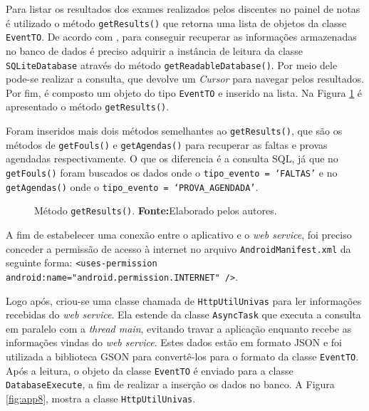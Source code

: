 	\par Para listar os resultados dos exames realizados pelos discentes no painel
de notas é utilizado o método \texttt{getResults()} que retorna uma lista de
objetos da classe \texttt{EventTO}. De acordo com ,
para conseguir recuperar as informações armazenadas no banco de dados é preciso
adquirir a instância de leitura da classe \texttt{SQLiteDatabase} através do
método \texttt{getReadableDatabase()}. Por meio dele pode-se realizar a
consulta, que devolve um \textit{Cursor} para navegar pelos resultados. Por
fim, é composto um objeto do tipo \texttt{EventTO} e inserido na lista. Na
Figura \ref{fig:app7} é apresentado o método \texttt{getResults()}.

	\par Foram inseridos mais dois métodos semelhantes ao \texttt{getResults()},
que são os métodos de \texttt{getFouls()} e \texttt{getAgendas()} para
recuperar as faltas e provas agendadas respectivamente. O que os diferencia é a
consulta SQL, já que no \texttt{getFouls()}  foram buscados os dados onde o
\texttt{tipo\_evento = ‘FALTAS'} e no \texttt{getAgendas()} onde o
\texttt{tipo\_evento = ‘PROVA\_AGENDADA'}.

	\begin{figure}[h!] 
		
		\caption[Método getResults()]{Método \texttt{getResults()}.
		\textbf{Fonte:}Elaborado pelos autores.}
		\label{fig:app7}
	\end{figure}
	
	\pagebreak
		
	\par A fim de estabelecer uma conexão entre o aplicativo e o \textit{web
service}, foi preciso conceder a permissão de acesso à internet no arquivo
\texttt{AndroidManifest.xml} da seguinte forma: \texttt{<uses-permission
android:name="android.permission.INTERNET" />}.

	\par Logo após, criou-se uma classe chamada de \texttt{HttpUtilUnivas} para ler
informações recebidas do \textit{web service}. Ela estende da classe
\texttt{AsyncTask} que executa a consulta em paralelo com a \textit{thread
main}, evitando travar a aplicação enquanto recebe as informações vindas do
\textit{web service}. Estes dados estão em formato JSON e foi utilizada a
biblioteca GSON para convertê-los para o formato da classe \texttt{EventTO}.
Após a leitura, o objeto da classe \texttt{EventTO} é enviado para a classe
\texttt{DatabaseExecute}, a fim de realizar a inserção os dados no banco. A
Figura \ref{fig:app8}, mostra a classe \texttt{HttpUtilUnivas}.

